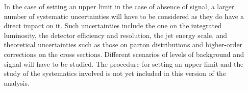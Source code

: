 In the case of setting an upper limit in the case of absence of signal, a larger number of systematic
uncertainties will have to be considered as they do have a direct impact on it. 
Such uncertainties include the one on the integrated luminosity, the detector efficiency and 
resolution, the jet energy scale, and theoretical uncertainties such as those on parton distributions
and higher-order corrections on the cross sections. Different scenarios of levels of background
and signal will have to be studied. The procedure for setting an upper limit and the study of the 
systematics involved is not yet included in this version of the analysis.



%
